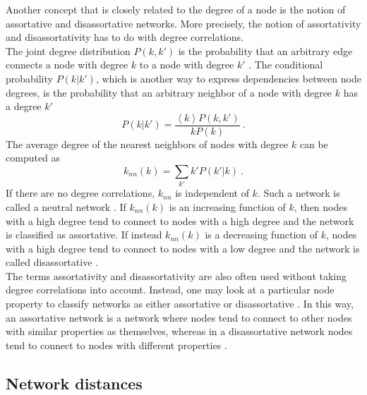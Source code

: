 \documentclass[11 pt , letterpaper , twoside , openright]{book}
\begin{document}
Another concept that is closely related to the degree of a node is the notion of assortative and disassortative networks. More precisely, the notion of assortativity and disassortativity has to do with degree correlations. \\
\newline
The joint degree distribution $P(k, k')$ is the probability that an arbitrary edge connects a node with degree $k$ to a node with degree $k'$ \cite{F.Costa2007}. The conditional probability $P(k|k')$, which is another way to express dependencies between node degrees, is the probability that an arbitrary neighbor of a node with degree $k$ has a degree $k'$ \cite{F.Costa2007}
\begin{equation}
	P(k|k') = \frac{\left<k\right>P(k, k')}{kP(k)} \ .
\end{equation}
The average degree of the nearest neighbors of nodes with degree $k$ can be computed as \cite{F.Costa2007}
\begin{equation}
	k_{nn}(k) = \sum_{k'} k'P(k'|k) \ .
\end{equation}
If there are no degree correlations, $k_{nn}$ is independent of $k$. Such a network is called a neutral network \cite{F.Costa2007}. If $k_{nn}(k)$ is an increasing function of $k$, then nodes with a high degree tend to connect to nodes with a high degree and the network is classified as assortative. If instead $k_{nn}(k)$ is a decreasing function of $k$, nodes with a high degree tend to connect to nodes with a low degree and the network is called disassortative \cite{F.Costa2007}.\\
\newline
The terms assortativity and disassortativity are also often used without taking degree correlations into account. Instead, one may look at a particular node property to classify networks as either assortative or disassortative \cite{Thed2014}. In this way, an assortative network is a network where nodes tend to connect to other nodes with similar properties as themselves, whereas in a disassortative network nodes tend to connect to nodes with different properties \cite{Thed2014}.

\subsection{Network distances}
\end{document}
